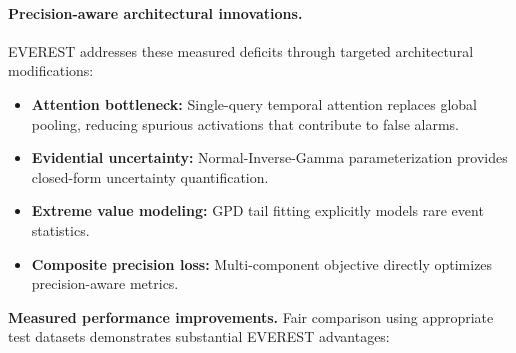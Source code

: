\paragraph{Precision-aware architectural innovations.}
\textsc{EVEREST} addresses these measured deficits through targeted architectural modifications:

\begin{itemize}
\item \textbf{Attention bottleneck:} Single-query temporal attention replaces global pooling, reducing spurious activations that contribute to false alarms.
\item \textbf{Evidential uncertainty:} Normal-Inverse-Gamma parameterization provides closed-form uncertainty quantification.
\item \textbf{Extreme value modeling:} GPD tail fitting explicitly models rare event statistics.
\item \textbf{Composite precision loss:} Multi-component objective directly optimizes precision-aware metrics.
\end{itemize}

\textbf{Measured performance improvements.}
Fair comparison using appropriate test datasets demonstrates substantial \textsc{EVEREST} advantages:

